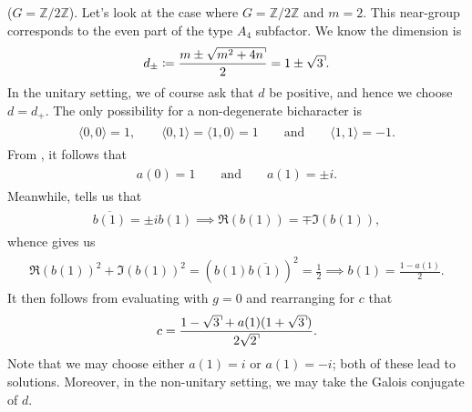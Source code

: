 \noindent\begin{example}\textup{($G = \mathbb{Z}/2\mathbb{Z}$).} Let's look at the case where $G = \mathbb{Z}/2\mathbb{Z}$ and $m = 2$. This near-group corresponds to the even part of the type $A_4$ subfactor. We know the dimension is
\begin{align*}
\begin{split}
d_\pm \coloneqq \frac{m \pm \csqrt{m^2 + 4n}}{2} = 1 \pm \csqrt{3}.
\end{split}
\end{align*}
\noindent In the unitary setting, we of course ask that $d$ be positive, and hence we choose $d = d_+$. The only possibility for a non-degenerate bicharacter is
\begin{align*}
\begin{split}
\langle 0, 0\rangle = 1,\qquad\langle 0, 1\rangle = \langle 1, 0\rangle = 1\qquad\text{and}\qquad\langle 1, 1\rangle = -1.
\end{split}
\end{align*}
\noindent From \cite[Equation 7.8]{Izu17}, it follows that
\begin{align*}
\begin{split}
a(0) = 1\qquad\text{and}\qquad a(1) = \pm i.
\end{split}
\end{align*}
\noindent Meanwhile, \cite[Equation 9.4]{Izu17} tells us that
\begin{align*}
\begin{split}
\overline{b(1)} = \pm i b(1) \implies \mathfrak{R}(b(1)) = \mp \mathfrak{I}(b(1)),
\end{split}
\end{align*}
\noindent whence \cite[Equation 9.3]{Izu17} gives us
\begin{align*}
\begin{split}
\mathfrak{R}(b(1))^2 + \mathfrak{I}(b(1))^2 = (b(1)\overline{b(1)})^2 = \frac{1}{2} \implies b(1) = \frac{1 - a(1)}{2}.
\end{split}
\end{align*}
\noindent It then follows from evaluating \cite[Equation 9.1]{Izu17} with $g = 0$ and rearranging for $c$ that
\begin{align*}
\begin{split}
c = \frac{1 - \csqrt{3} + a(1)(1 + \csqrt{3})}{2\csqrt{2}}.
\end{split}
\end{align*}
\noindent Note that we may choose either $a(1) = i$ or $a(1) = -i$; both of these lead to solutions. Moreover, in the non-unitary setting, we may take the Galois conjugate of $d$.
\end{example}
\newpage


